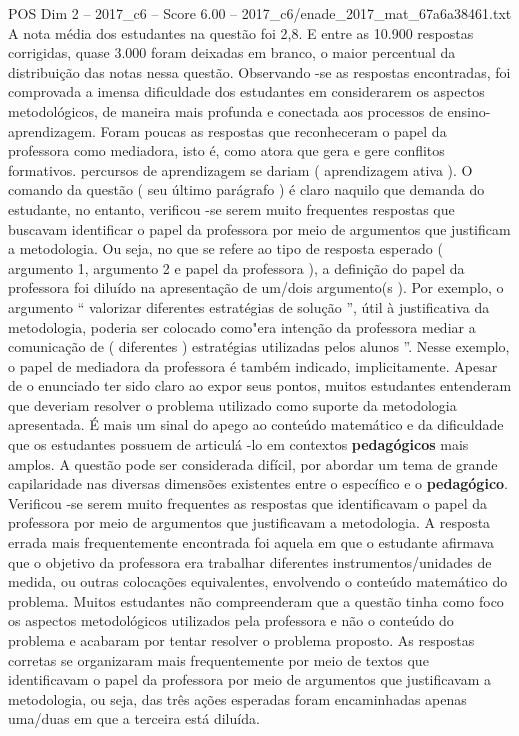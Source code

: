 \begin{textsample}{POS Dim 2 – 2017\_c6 – Score 6.00 – 2017\_c6/enade\_2017\_mat\_67a6a38461.txt}
A nota média dos estudantes na questão foi 2,8.
E entre as 10.900 respostas corrigidas, quase 3.000 foram deixadas em branco, o maior percentual da distribuição das notas nessa questão.
Observando -se as respostas encontradas, foi comprovada a imensa dificuldade dos estudantes em considerarem os aspectos metodológicos, de maneira mais profunda e conectada aos processos de ensino-aprendizagem.
Foram poucas as respostas que reconheceram o papel da professora como mediadora, isto é, como atora que gera e gere conflitos formativos. percursos de aprendizagem se dariam ( aprendizagem ativa ).
O comando da questão ( seu último parágrafo ) é claro naquilo que demanda do estudante, no entanto, verificou -se serem muito frequentes respostas que buscavam identificar o papel da professora por meio de argumentos que justificam a metodologia.
Ou seja, no que se refere ao tipo de resposta esperado ( argumento 1, argumento 2 e papel da professora ), a definição do papel da professora foi diluído na apresentação de um/dois argumento(s ).
Por exemplo, o argumento “ valorizar diferentes estratégias de solução ”, útil à justificativa da metodologia, poderia ser colocado como"era intenção da professora mediar a comunicação de ( diferentes ) estratégias utilizadas pelos alunos ”.
Nesse exemplo, o papel de mediadora da professora é também indicado, implicitamente.
Apesar de o enunciado ter sido claro ao expor seus pontos, muitos estudantes entenderam que deveriam resolver o problema utilizado como suporte da metodologia apresentada.
É mais um sinal do apego ao conteúdo matemático e da dificuldade que os estudantes possuem de articulá -lo em contextos \textbf{pedagógicos} mais amplos.
A questão pode ser considerada difícil, por abordar um tema de grande capilaridade nas diversas dimensões existentes entre o específico e o \textbf{pedagógico}.
Verificou -se serem muito frequentes as respostas que identificavam o papel da professora por meio de argumentos que justificavam a metodologia.
A resposta errada mais frequentemente encontrada foi aquela em que o estudante afirmava que o objetivo da professora era trabalhar diferentes instrumentos/unidades de medida, ou outras colocações equivalentes, envolvendo o conteúdo matemático do problema.
Muitos estudantes não compreenderam que a questão tinha como foco os aspectos metodológicos utilizados pela professora e não o conteúdo do problema e acabaram por tentar resolver o problema proposto.
As respostas corretas se organizaram mais frequentemente por meio de textos que identificavam o papel da professora por meio de argumentos que justificavam a metodologia, ou seja, das três ações esperadas foram encaminhadas apenas uma/duas em que a terceira está diluída.

\end{textsample}
